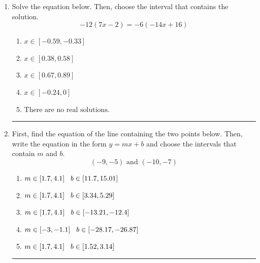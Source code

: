 \documentclass[14pt]{extbook}
\newcommand{\litem}[1]{\item#1\hspace*{-1cm}\rule{\textwidth}{0.4pt}}
\begin{document}
\begin{enumerate}
{\begin{enumerate}[label=\Alph*.]
\end{enumerate} }
\litem{
Solve the equation below. Then, choose the interval that contains the solution.\[ -12(7x -2) = -6(-14x + 16) \]\begin{enumerate}[label=\Alph*.]
\item \( x \in [-0.59, -0.33] \)
\item \( x \in [0.38, 0.58] \)
\item \( x \in [0.67, 0.89] \)
\item \( x \in [-0.24, 0] \)
\item \( \text{There are no real solutions.} \)

\end{enumerate} }
\litem{
First, find the equation of the line containing the two points below. Then, write the equation in the form $ y=mx+b $ and choose the intervals that contain $m$ and $b$.\[ (-9, -5) \text{ and } (-10, -7) \]\begin{enumerate}[label=\Alph*.]
\item \( m \in [1.7, 4.1] \hspace*{3mm} b \in [11.7, 15.01] \)
\item \( m \in [1.7, 4.1] \hspace*{3mm} b \in [3.34, 5.29] \)
\item \( m \in [1.7, 4.1] \hspace*{3mm} b \in [-13.21, -12.4] \)
\item \( m \in [-3, -1.1] \hspace*{3mm} b \in [-28.17, -26.87] \)
\item \( m \in [1.7, 4.1] \hspace*{3mm} b \in [1.52, 3.14] \)


\end{enumerate}}
\end{enumerate}
\end{document}
